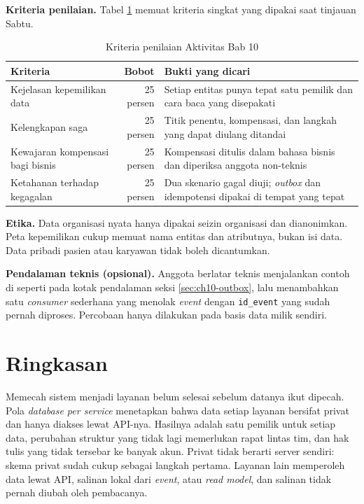 \textbf{Kriteria penilaian.} Tabel \ref{tab:ch10-kriteria-aktivitas} memuat kriteria singkat yang
dipakai saat tinjauan Sabtu.

\begin{table}[!htb]
  \centering
  \caption{Kriteria penilaian Aktivitas Bab 10}
  \label{tab:ch10-kriteria-aktivitas}
  \footnotesize
  \begin{tabularx}{\textwidth}{>{\raggedright\arraybackslash}X r >{\raggedright\arraybackslash}X}
    \hline
    \textbf{Kriteria} & \textbf{Bobot} & \textbf{Bukti yang dicari} \\ \hline
    Kejelasan kepemilikan data & 25 persen & Setiap entitas punya tepat satu pemilik dan cara baca
      yang disepakati \\ \hline
    Kelengkapan saga & 25 persen & Titik penentu, kompensasi, dan langkah yang dapat diulang
      ditandai \\ \hline
    Kewajaran kompensasi bagi bisnis & 25 persen & Kompensasi ditulis dalam bahasa bisnis dan
      diperiksa anggota non-teknis \\ \hline
    Ketahanan terhadap kegagalan & 25 persen & Dua skenario gagal diuji; \textit{outbox} dan
      idempotensi dipakai di tempat yang tepat \\ \hline
  \end{tabularx}
\end{table}

\textbf{Etika.} Data organisasi nyata hanya dipakai seizin organisasi dan dianonimkan. Peta
kepemilikan cukup memuat nama entitas dan atributnya, bukan isi data. Data pribadi pasien atau
karyawan tidak boleh dicantumkan.

\textbf{Pendalaman teknis (opsional).} Anggota berlatar teknis menjalankan contoh di
 seperti pada kotak pendalaman seksi
\ref{sec:ch10-outbox}, lalu menambahkan satu \textit{consumer} sederhana yang menolak
\textit{event} dengan \texttt{id\_event} yang sudah pernah diproses. Percobaan hanya dilakukan pada
basis data milik sendiri.

\section{Ringkasan}

Memecah sistem menjadi layanan belum selesai sebelum datanya ikut dipecah. Pola \textit{database per
service} menetapkan bahwa data setiap layanan bersifat privat dan hanya diakses lewat API-nya.
Hasilnya adalah satu pemilik untuk setiap data, perubahan struktur yang tidak lagi memerlukan rapat
lintas tim, dan hak tulis yang tidak tersebar ke banyak akun. Privat tidak berarti server sendiri:
skema privat sudah cukup sebagai langkah pertama. Layanan lain memperoleh data lewat API, salinan
lokal dari \textit{event}, atau \textit{read model}, dan salinan tidak pernah diubah oleh pembacanya.

